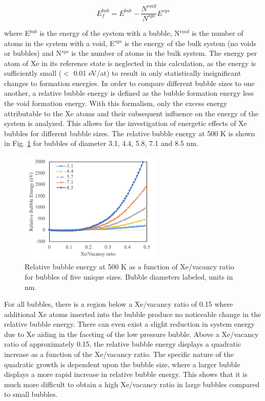 \documentclass[review]{elsarticle}
\begin{document}
\begin{equation}
\label{eq:bubE}
E_f^{bub}= E^{bub}-\frac{N^{void}}{N^{sys}}E^{sys}
\end{equation}

where E$^{bub}$ is the energy of the system with a bubble, N$^{void}$ is the number of atoms in the system with a void, E$^{sys}$ is the energy of the bulk system (no voids or bubbles) and N$^{sys}$ is the number of atoms in the bulk system. The energy per atom of Xe in its reference state is neglected in this calculation, as the energy is sufficiently small ($<$ 0.01 eV/at) to result in only statistically insignificant changes to formation energies. In order to compare different bubble sizes to one another, a relative bubble energy is defined as the bubble formation energy less the void formation energy. With this formalism, only the excess energy attributable to the Xe atoms and their subsequent influence on the energy of the system is analyzed. This allows for the investigation of energetic effects of Xe bubbles for different bubble sizes. The relative bubble energy at 500 K is shown in Fig. \ref{fig:bubE} for bubbles of diameter 3.1, 4.4, 5.8, 7.1 and 8.5 nm. 

\begin{figure}[h]
 \centering
 \includegraphics[width=0.6\textwidth]{3_bubE.png} 
 \caption{Relative bubble energy at 500 K as a function of Xe/vacancy ratio for bubbles of five unique sizes. Bubble diameters labeled, units in nm.}
 \label{fig:bubE}
\end{figure}

For all bubbles, there is a region below a Xe/vacancy ratio of 0.15 where additional Xe atoms inserted into the bubble produce no noticeable change in the relative bubble energy. There can even exist a slight reduction in system energy due to Xe aiding in the faceting of the low pressure bubble. Above a Xe/vacancy ratio of approximately 0.15, the relative bubble energy displays a quadratic increase as a function of the Xe/vacancy ratio. The specific nature of the quadratic growth is dependent upon the bubble size, where a larger bubble displays a more rapid increase in relative bubble energy. This shows that it is much more difficult to obtain a high Xe/vacancy ratio in large bubbles compared to small bubbles. 
\end{document}
